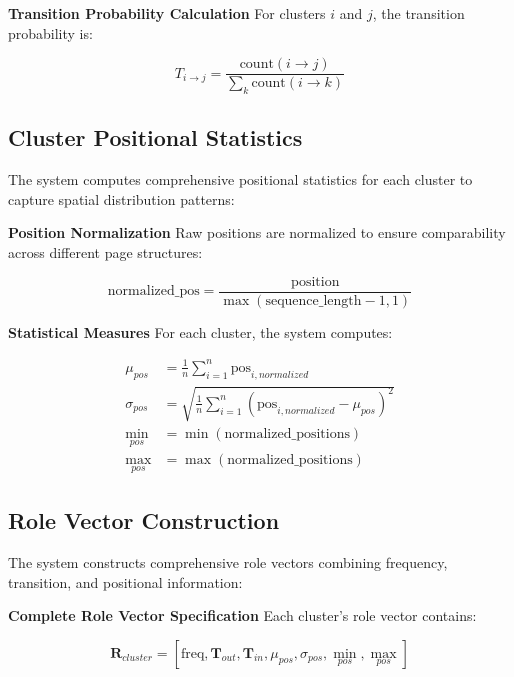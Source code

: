 \textbf{Transition Probability Calculation}
For clusters $i$ and $j$, the transition probability is:

\begin{equation}
T_{i \rightarrow j} = \frac{\text{count}(i \rightarrow j)}{\sum_{k} \text{count}(i \rightarrow k)}
\end{equation}

\subsection{Cluster Positional Statistics}
\label{subsec:positional-statistics}

The system computes comprehensive positional statistics for each cluster to capture spatial distribution patterns:

\textbf{Position Normalization}
Raw positions are normalized to ensure comparability across different page structures:

\begin{equation}
\text{normalized\_pos} = \frac{\text{position}}{\max(\text{sequence\_length} - 1, 1)}
\end{equation}

\textbf{Statistical Measures}
For each cluster, the system computes:

\begin{align}
\mu_{pos} &= \frac{1}{n} \sum_{i=1}^{n} \text{pos}_{i,normalized} \\
\sigma_{pos} &= \sqrt{\frac{1}{n} \sum_{i=1}^{n} (\text{pos}_{i,normalized} - \mu_{pos})^2} \\
\min_{pos} &= \min(\text{normalized\_positions}) \\
\max_{pos} &= \max(\text{normalized\_positions})
\end{align}

\subsection{Role Vector Construction}
\label{subsec:role-vector-construction}

The system constructs comprehensive role vectors combining frequency, transition, and positional information:

\textbf{Complete Role Vector Specification}
Each cluster's role vector contains:

\begin{equation}
\mathbf{R}_{cluster} = [\text{freq}, \mathbf{T}_{out}, \mathbf{T}_{in}, \mu_{pos}, \sigma_{pos}, \min_{pos}, \max_{pos}]
\end{equation}

